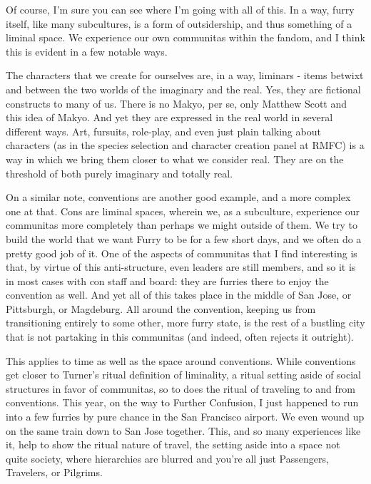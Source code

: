 Of course, I'm sure you can see where I'm going with all of this. In a
way, furry itself, like many subcultures, is a form of outsidership, and
thus something of a liminal space. We experience our own communitas
within the fandom, and I think this is evident in a few notable ways.

The characters that we create for ourselves are, in a way, liminars -
items betwixt and between the two worlds of the imaginary and the real.
Yes, they are fictional constructs to many of us. There is no Makyo, per
se, only Matthew Scott and this idea of Makyo. And yet they are
expressed in the real world in several different ways. Art, fursuits,
role-play, and even just plain talking about characters (as in the
species selection and character creation panel at RMFC) is a way in
which we bring them closer to what we consider real. They are on the
threshold of both purely imaginary and totally real.

On a similar note, conventions are another good example, and a more
complex one at that. Cons are liminal spaces, wherein we, as a
subculture, experience our communitas more completely than perhaps we
might outside of them. We try to build the world that we want Furry to
be for a few short days, and we often do a pretty good job of it. One of
the aspects of communitas that I find interesting is that, by virtue of
this anti-structure, even leaders are still members, and so it is in
most cases with con staff and board: they are furries there to enjoy the
convention as well. And yet all of this takes place in the middle of San
Jose, or Pittsburgh, or Magdeburg. All around the convention, keeping us
from transitioning entirely to some other, more furry state, is the rest
of a bustling city that is not partaking in this communitas (and indeed,
often rejects it outright).

This applies to time as well as the space around conventions. While
conventions get closer to Turner's ritual definition of liminality, a
ritual setting aside of social structures in favor of communitas, so to
does the ritual of traveling to and from conventions. This year, on the
way to Further Confusion, I just happened to run into a few furries by
pure chance in the San Francisco airport. We even wound up on the same
train down to San Jose together. This, and so many experiences like it,
help to show the ritual nature of travel, the setting aside into a space
not quite society, where hierarchies are blurred and you're all just
Passengers, Travelers, or Pilgrims.

